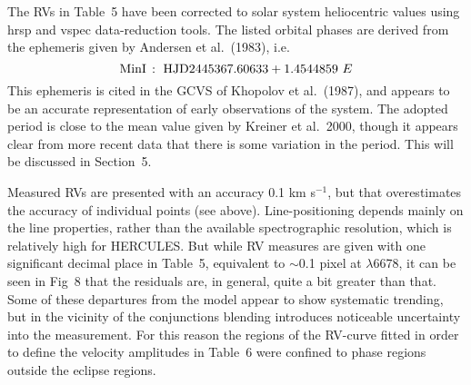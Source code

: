 \documentclass[useAMS,usenatbib]{mnras}                                                                           \usepackage[pdftex]{graphicx}
\begin{document}
The RVs in Table~5 have been corrected
to solar system heliocentric values using 
{\sc hrsp} and {\sc vspec} data-reduction tools.  The listed  orbital phases
are derived from  the  ephemeris given by Andersen et al.\ (1983), i.e.\
\begin{equation}
{\rm Min I} \, : \,\, {\rm HJD}2445367.60633 + 1.4544859 \,\, E
\end{equation}
This ephemeris is cited in the GCVS of Khopolov et al.\ (1987),
  and appears to be an accurate representation of early 
  observations of the system.  The adopted period is close to the mean value given by 
  Kreiner et al.\ 2000, though it appears clear from more recent data
  that there is some variation in the period. This will be discussed in Section~5.
  
   Measured RVs
are presented with an accuracy 0.1 km s$^{-1}$, 
but that overestimates the
accuracy of individual points (see above). 
Line-positioning  depends mainly on the
line properties, rather than the available 
spectrographic resolution, which is relatively high for HERCULES.
But while  RV measures are given with one significant
decimal place in Table~5, equivalent to $\sim$0.1 pixel at $\lambda$6678,
it can be seen in Fig~8 that the residuals are, in general,
quite a bit greater than that.   Some of these departures from the model
appear to show systematic trending,
but in the vicinity of the conjunctions blending introduces 
noticeable uncertainty into the measurement.  For this reason
the regions of the RV-curve fitted in order to define the velocity amplitudes in Table~6 
were confined to  phase regions outside the eclipse regions.
\end{document}
